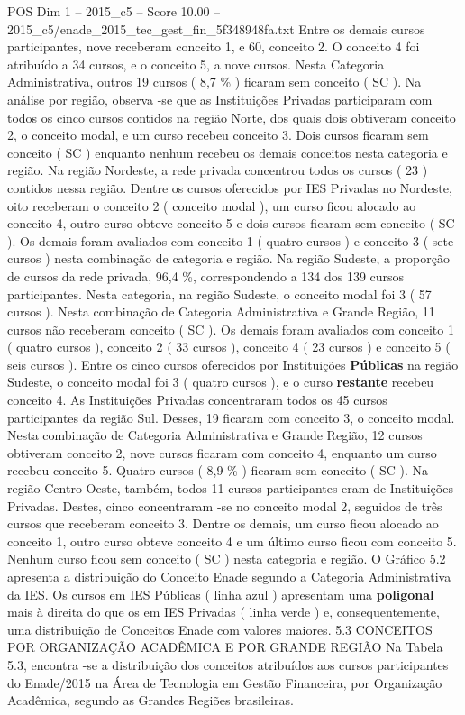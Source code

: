 \begin{textsample}{POS Dim 1 – 2015\_c5 – Score 10.00 – 2015\_c5/enade\_2015\_tec\_gest\_fin\_5f348948fa.txt}
Entre os demais cursos participantes, nove receberam conceito 1, e 60, conceito 2.
O conceito 4 foi atribuído a 34 cursos, e o conceito 5, a nove cursos.
Nesta Categoria Administrativa, outros 19 cursos ( 8,7 \% ) ficaram sem conceito ( SC ).
Na análise por região, observa -se que as Instituições Privadas participaram com todos os cinco cursos contidos na região Norte, dos quais dois obtiveram conceito 2, o conceito modal, e um curso recebeu conceito 3.
Dois cursos ficaram sem conceito ( SC ) enquanto nenhum recebeu os demais conceitos nesta categoria e região.
Na região Nordeste, a rede privada concentrou todos os cursos ( 23 ) contidos nessa região.
Dentre os cursos oferecidos por IES Privadas no Nordeste, oito receberam o conceito 2 ( conceito modal ), um curso ficou alocado ao conceito 4, outro curso obteve conceito 5 e dois cursos ficaram sem conceito ( SC ).
Os demais foram avaliados com conceito 1 ( quatro cursos ) e conceito 3 ( sete cursos ) nesta combinação de categoria e região.
Na região Sudeste, a proporção de cursos da rede privada, 96,4 \%, correspondendo a 134 dos 139 cursos participantes.
Nesta categoria, na região Sudeste, o conceito modal foi 3 ( 57 cursos ).
Nesta combinação de Categoria Administrativa e Grande Região, 11 cursos não receberam conceito ( SC ).
Os demais foram avaliados com conceito 1 ( quatro cursos ), conceito 2 ( 33 cursos ), conceito 4 ( 23 cursos ) e conceito 5 ( seis cursos ).
Entre os cinco cursos oferecidos por Instituições \textbf{Públicas} na região Sudeste, o conceito modal foi 3 ( quatro cursos ), e o curso \textbf{restante} recebeu conceito 4.
As Instituições Privadas concentraram todos os 45 cursos participantes da região Sul.
Desses, 19 ficaram com conceito 3, o conceito modal.
Nesta combinação de Categoria Administrativa e Grande Região, 12 cursos obtiveram conceito 2, nove cursos ficaram com conceito 4, enquanto um curso recebeu conceito 5.
Quatro cursos ( 8,9 \% ) ficaram sem conceito ( SC ).
Na região Centro-Oeste, também, todos 11 cursos participantes eram de Instituições Privadas.
Destes, cinco concentraram -se no conceito modal 2, seguidos de três cursos que receberam conceito 3.
Dentre os demais, um curso ficou alocado ao conceito 1, outro curso obteve conceito 4 e um último curso ficou com conceito 5.
Nenhum curso ficou sem conceito ( SC ) nesta categoria e região.
O Gráfico 5.2 apresenta a distribuição do Conceito Enade segundo a Categoria Administrativa da IES.
Os cursos em IES Públicas ( linha azul ) apresentam uma \textbf{poligonal} mais à direita do que os em IES Privadas ( linha verde ) e, consequentemente, uma distribuição de Conceitos Enade com valores maiores. 5.3 CONCEITOS POR ORGANIZAÇÃO ACADÊMICA E POR GRANDE REGIÃO Na Tabela 5.3, encontra -se a distribuição dos conceitos atribuídos aos cursos participantes do Enade/2015 na Área de Tecnologia em Gestão Financeira, por Organização Acadêmica, segundo as Grandes Regiões brasileiras.

\end{textsample}

